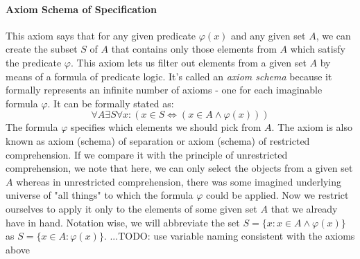 \paragraph{Axiom Schema of Specification}
This axiom says that for any given predicate $\varphi(x)$ and any given set $A$, we can create the subset $S$ of $A$ that contains only those elements from $A$ which satisfy the predicate $\varphi$. This axiom lets us filter out elements from a given set $A$ by means of a formula of predicate logic. It's called an \emph{axiom schema} because it formally represents an infinite number of axioms - one for each imaginable formula $\varphi$. It can be formally stated as:
\begin{equation}
\forall A \exists S \forall x: (x \in S \Leftrightarrow (x \in A \wedge \varphi(x)) )
\end{equation}
The formula $\varphi$ specifies which elements we should pick from $A$. The axiom is also known as axiom (schema) of separation or axiom (schema) of restricted comprehension. If we compare it with the principle of unrestricted comprehension, we note that here, we can only select the objects from a given set $A$ whereas in unrestricted comprehension, there was some imagined underlying universe of "all things" to which the formula $\varphi$ could be applied. Now we restrict ourselves to apply it only to the elements of some given set $A$ that we already have in hand. Notation wise, we will abbreviate the set $S = \{ x : x \in A \wedge \varphi(x) \}$ as $S = \{ x \in A :  \varphi(x) \}$. ...TODO: use variable naming consistent with the axioms above







